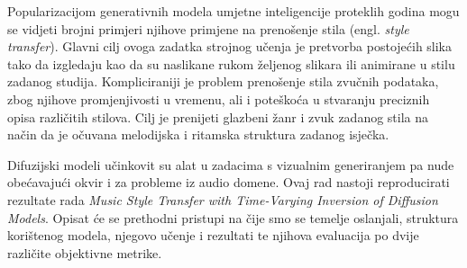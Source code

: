 Popularizacijom generativnih modela umjetne inteligencije proteklih godina mogu se vidjeti brojni primjeri njihove primjene na prenošenje stila (engl. \textit{style transfer})\cite{jing2019neural}. Glavni cilj ovoga zadatka strojnog učenja je pretvorba postojećih slika tako da izgledaju kao da su naslikane rukom željenog slikara ili animirane u stilu zadanog studija. Kompliciraniji je problem prenošenje stila zvučnih podataka, zbog njihove promjenjivosti u vremenu, ali i poteškoća u stvaranju preciznih opisa različitih stilova. Cilj je prenijeti glazbeni žanr i zvuk zadanog stila na način da je očuvana melodijska i ritamska struktura zadanog isječka.

Difuzijski modeli\cite{yang2023diffusion} učinkovit su alat u zadacima s vizualnim generiranjem pa nude obećavajući okvir i za probleme iz audio domene. Ovaj rad nastoji reproducirati rezultate rada \textit{Music Style Transfer with Time-Varying Inversion of Diffusion Models}\cite{huang2024musicstyletransferdiffusion}. Opisat će se prethodni pristupi na čije smo se temelje oslanjali, struktura korištenog modela, njegovo učenje i rezultati te njihova evaluacija po dvije različite objektivne metrike.

